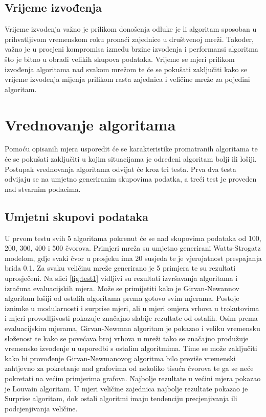 \documentclass[times, utf8, diplomski]{fer}
\begin{document}
\subsection{Vrijeme izvođenja}
Vrijeme izvođenja važno je prilikom donošenja odluke je li algoritam sposoban u prihvatljivom vremenskom roku pronaći zajednice u društvenoj mreži. Također, važno je u procjeni kompromisa između brzine izvođenja i performansi algoritma što je bitno u obradi velikih skupova podataka. Vrijeme se mjeri prilikom izvođenja algoritama nad svakom mrežom te će se pokušati zaključiti kako se vrijeme izvođenja mijenja prilikom rasta zajednica i veličine mreže za pojedini algoritam.


\section{Vrednovanje algoritama}
Pomoću opisanih mjera usporedit će se karakteristike promatranih algoritama te će se pokušati zaključiti u kojim situacijama je određeni algoritam bolji ili lošiji. Postupak vrednovanja algoritama odvijat će kroz tri testa.  Prva dva testa odvijaju se na umjetno generiranim skupovima podatka, a treći test je proveden nad stvarnim podacima.

\subsection{Umjetni skupovi podataka}
U prvom testu svih 5 algoritama pokrenut će se nad skupovima podataka od 100, 200, 300, 400 i 500 čvorova. Primjeri mreža su umjetno generirani Watts-Strogatz modelom, gdje svaki čvor u prosjeku ima 20 susjeda te je vjerojatnost prespajanja brida 0.1. Za svaku veličinu mreže generirano je 5 primjera te su rezultati uprosječeni. Na slici \ref{fig:test1} vidljivi su rezultati izvršavanja algoritama i izračuna evaluacijskih mjera. Može se primijetiti kako je Girvan-Newannov algoritam lošiji od ostalih algoritama prema gotovo svim mjerama. Postoje iznimke u modularnosti i surprise mjeri, ali u mjeri omjera vrhova u trokutovima i  mjeri provodljivosti pokazuje značajno slabije rezultate od ostalih. Osim prema evaluacijskim mjerama, Girvan-Newman algoritam je pokazao i veliku vremensku složenost te kako se povećava broj vrhova u mreži tako se značajno produžuje vremensko izvođenje u usporedbi s ostalim algoritmima. Time se može zaključiti kako bi provođenje Girvan-Newmanovog algoritma bilo previše vremenski zahtjevno za pokretanje nad grafovima od nekoliko tisuća čvorova te ga se neće pokretati na većim primjerima grafova. Najbolje rezultate u većini mjera pokazao je Louvain algoritam. U mjeri veličine zajednica najbolje rezultate pokazao je Surprise algoritam, dok ostali algoritmi imaju tendenciju precjenjivanja ili podcjenjivanja veličine.
\end{document}
